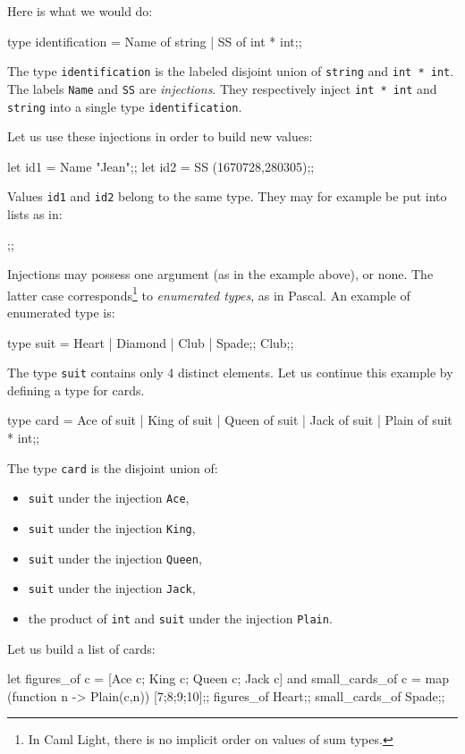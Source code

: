 Here is what we would do:
\begin{caml_example}
type identification = Name of string
                    | SS of int * int;;
\end{caml_example}
The type {\tt identification} is the labeled disjoint union of {\tt string}
and \verb|int * int|.
The labels {\tt Name} and {\tt SS} are {\em injections}.
They respectively inject \verb|int * int| and {\tt string} into a single type
{\tt identification}.

Let us use these injections in order to build new values:
\begin{caml_example}
let id1 = Name "Jean";;
let id2 = SS (1670728,280305);;
\end{caml_example}
Values {\tt id1} and {\tt id2} belong to the same type. They may for
example be put into lists as in:
\begin{caml_example}
[id1;id2];;
\end{caml_example}

Injections may possess one argument (as in the example above), or
none. The latter case corresponds\footnote{In Caml Light, there is no
implicit order on values of sum types.} to {\em enumerated types}, as
in Pascal. An example of enumerated type is:
\begin{caml_example}
type suit = Heart
          | Diamond
          | Club
          | Spade;;
Club;;
\end{caml_example}
The type {\tt suit} contains only 4 distinct elements.
Let us continue this example by defining a type for cards.
\begin{caml_example}
type card = Ace of suit
          | King of suit
          | Queen of suit
          | Jack of suit
          | Plain of suit * int;;
\end{caml_example}
The type {\tt card} is the disjoint union of:
\begin{itemize}
\item {\tt suit} under the injection {\tt Ace},
\item {\tt suit} under the injection {\tt King},
\item {\tt suit} under the injection {\tt Queen},
\item {\tt suit} under the injection {\tt Jack},
\item the product of {\tt int} and  {\tt suit} under the injection {\tt Plain}.
\end{itemize}
Let us build a list of cards:
\begin{caml_example}
let figures_of c = [Ace c; King c; Queen c; Jack c]
and small_cards_of c =
    map (function n -> Plain(c,n)) [7;8;9;10];;
figures_of Heart;;
small_cards_of Spade;;
\end{caml_example}

